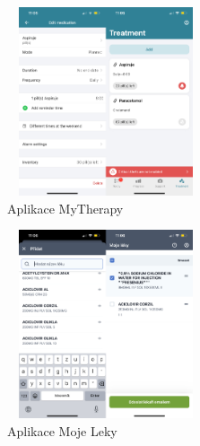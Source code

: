 \documentclass[a4paper, 11pt]{article}
\begin{document}
 \begin{figure}[!ht]
		\centering	\includegraphics[width=220,height=210,keepaspectratio]{mytherapy.jpeg}
		\caption{Aplikace MyTherapy}
		\label{figure:mytherapy}
	\end{figure}
 \begin{figure}[!ht]
		\centering
		\includegraphics[width=220,height=210,keepaspectratio]{moje leky.jpeg}
		\caption{Aplikace Moje Leky}
		\label{figure:moje leky}
	\end{figure}
 \FloatBarrier
\end{document}
